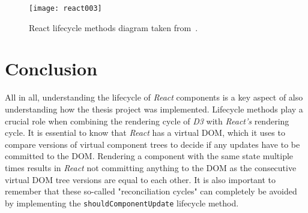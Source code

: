 \begin{figure}
  \centering
  \texttt{[image: react003]}
  \caption{React lifecycle methods diagram taken from~\cite{ReactRenderCycleDiagram}.}
  \label{fig:reactLifecycleMethods}
\end{figure}

\section{Conclusion}

All in all, understanding the lifecycle of \emph{React} components is a key aspect of also understanding how the thesis project was implemented. Lifecycle methods play a crucial role when combining the rendering cycle of \emph{D3} with \emph{React's} rendering cycle. It is essential to know that \emph{React} has a virtual DOM, which it uses to compare versions of virtual component trees to decide if any updates have to be committed to the DOM. Rendering a component with the same state multiple times results in \emph{React} not committing anything to the DOM as the consecutive virtual DOM tree versions are equal to each other. It is also important to remember that these so-called "reconciliation cycles" can completely be avoided by implementing the \texttt{shouldComponentUpdate} lifecycle method.






